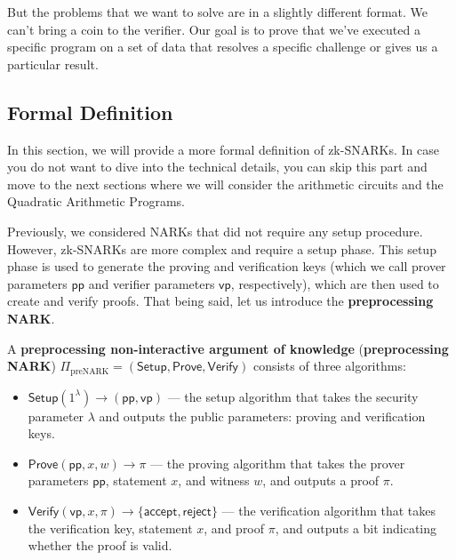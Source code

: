\documentclass[../lecture-notes.tex]{subfiles}
\begin{document}
But the problems that we want to solve are in a slightly different format. We can't bring a coin to
the verifier. Our goal is to prove that we've executed a specific program on a set of data that 
resolves a specific challenge or gives us a particular result.

\subsection{Formal Definition}

In this section, we will provide a more formal definition of zk-SNARKs. In case you do not want to
dive into the technical details, you can skip this part and move to the next sections where we will
consider the arithmetic circuits and the Quadratic Arithmetic Programs.

Previously, we considered NARKs that did not require any setup procedure. However, zk-SNARKs are
more complex and require a setup phase. This setup phase is used to generate the proving and
verification keys (which we call prover parameters $\mathsf{pp}$ and verifier parameters $\mathsf{vp}$, respectively), 
which are then used to create and verify proofs. That being said, let us introduce the \textbf{preprocessing NARK}.

\begin{definition}
    A \textbf{preprocessing non-interactive argument of knowledge} (\textbf{preprocessing NARK}) $\Pi_{\text{preNARK}}=(\mathsf{Setup},\mathsf{Prove},\mathsf{Verify})$ consists of three algorithms:
    \begin{itemize}
        \item $\mathsf{Setup}(1^\lambda) \rightarrow (\mathsf{pp}, \mathsf{vp})$ --- the setup algorithm that takes the security parameter $\lambda$ and outputs the public parameters: proving and verification keys.
        \item $\mathsf{Prove}(\mathsf{pp}, x, w) \rightarrow \pi$ --- the proving algorithm that takes the prover parameters $\mathsf{pp}$, statement $x$, and witness $w$, and outputs a proof $\pi$.
        \item $\mathsf{Verify}(\mathsf{vp}, x, \pi) \rightarrow \{\mathsf{accept}, \mathsf{reject}\}$ --- the verification algorithm that takes the verification key, statement $x$, and proof $\pi$, and outputs a bit indicating whether the proof is valid.
    \end{itemize}
\end{definition}
\end{document}
